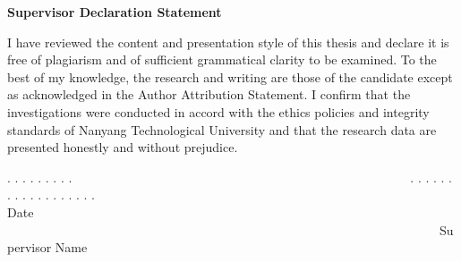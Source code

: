 \thispagestyle{empty}



\begin{center}
	\textbf{\large{Supervisor Declaration Statement}}
\end{center}

I have reviewed the content and presentation style of this thesis and declare it is free of plagiarism and of sufficient grammatical clarity to be examined.  To the best of my knowledge, the research and writing are those of the candidate except as acknowledged in the Author Attribution Statement.  I confirm that the investigations were conducted in accord with the ethics policies and integrity standards of Nanyang Technological University and that the research data are presented honestly and without prejudice.

\vfill

\begin{center}
	. . . . . . . . .~~~~~~~~~~~~~~~~~~~~~~~~~~~~~~~~~~~~~~~~~~~~~~~~~~~~~~. . . . . . . . . . . . . . . . . .\\
	Date ~~~~~~~~~~~~~~~~~~~~~~~~~~~~~~~~~~~~~~~~~~~~~~~~~~~~~~~~~~~~~~~~~~~~~Supervisor Name
\end{center}

\vspace{15em}

\cleardoublepage
